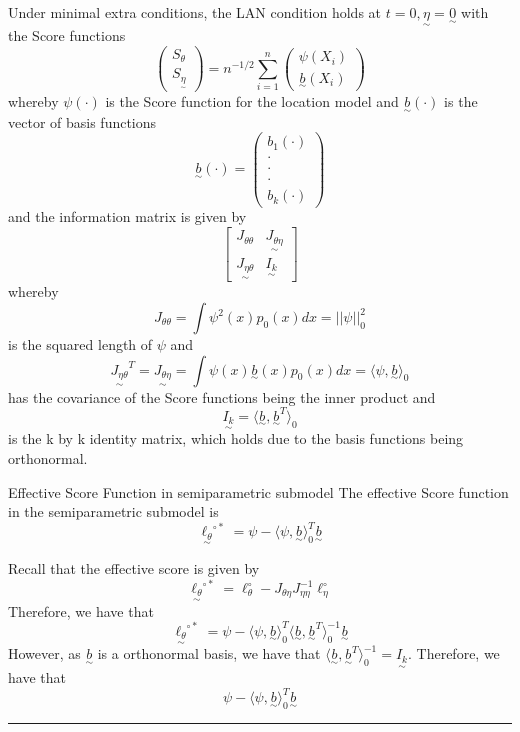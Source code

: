 \documentclass[twoside]{article}
\newenvironment{proof}{{\bf Proof:}}{\hfill\rule{2mm}{2mm}}
\newcommand{\utilde}{\underset{\sim}}
\begin{document}
Under minimal extra conditions, the LAN condition holds at $t = 0, \utilde{\eta} = \utilde{0}$ with the Score functions 
\begin{equation}
  \begin{pmatrix}
  S_{\theta}\\
  S_{\utilde{\eta}}
  \end{pmatrix}
  =
  n^{-1/2}
  \sum_{i=1}^{n}
  \begin{pmatrix}
  \psi(X_i)\\
  \utilde{b}(X_i)
  \end{pmatrix}
\end{equation}
whereby $\psi(\cdot)$ is the Score function for the location model and $\utilde{b}(\cdot)$ is the vector of basis functions 
$$
\utilde{b}(\cdot) = 
\begin{pmatrix}
b_1(\cdot)\\
\cdot \\
\cdot \\
\cdot \\
b_k(\cdot)
\end{pmatrix}
$$
and the information matrix is given by 
$$
\begin{bmatrix}
J_{\theta \theta} & \utilde{J_{\theta \eta}} \\
\utilde{J_{\eta \theta}} & \utilde{I_{k}}
\end{bmatrix}
$$
whereby 
$$
J_{\theta \theta} = \int \psi^2(x)p_0(x)dx = ||\psi||_{0}^{2}
$$
is the squared length of $\psi$ and
$$
\utilde{J_{\eta \theta}}^T = \utilde{J_{\theta \eta}} = \int \psi(x)\utilde{b}(x)p_0(x)dx = \langle \psi, \utilde{b} \rangle_0
$$
has the covariance of the Score functions being the inner product and 
$$
\utilde{I_{k}} = \langle \utilde{b}, \utilde{b}^T \rangle_0
$$
is the k by k identity matrix, which holds due to the basis functions being orthonormal.

\begin{proposition_exam}{Effective Score Function in semiparametric submodel}{} The effective Score function in the semiparametric submodel is 
$$
\utilde{\ell_{\theta}}^{\circ *} = \psi - \langle \psi, \utilde{b} \rangle_{0}^T \utilde{b}
$$
\end{proposition_exam}
\begin{proof} Recall that the effective score is given by 
$$
\utilde{\ell_{\theta}}^{\circ *}  = \ell_{\theta}^{\circ} - J_{\theta \eta}J_{\eta \eta}^{-1}\ell_{\eta}^{\circ}
$$
Therefore, we have that 
$$
\utilde{\ell_{\theta}}^{\circ *}  = \psi - \langle \psi, \utilde{b} \rangle_{0}^T \langle \utilde{b}, \utilde{b}^T \rangle_{0}^{-1} \utilde{b}
$$
However, as $\utilde{b}$ is a orthonormal basis, we have that $\langle \utilde{b}, \utilde{b}^T \rangle_{0}^{-1}  = \utilde{I_{k}}.$ Therefore, we have that 
$$
\psi - \langle \psi, \utilde{b} \rangle_{0}^T \utilde{b}
$$
\end{proof}
\end{document}
